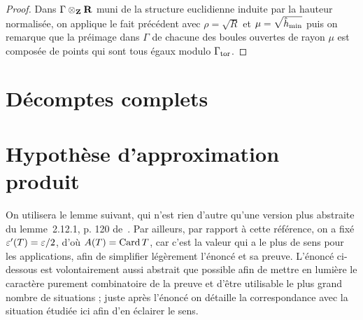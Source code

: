 \begin{proof}
  Dans \( \Gamma \otimes_{\mathbf{Z}} {\mathbf{R}} \) muni de la structure euclidienne induite par
  la hauteur normalisée, on applique le fait précédent avec \( \rho = \sqrt R
  \) et \( \mu = \sqrt{\hat h_{\mathrm{min}}} \) puis on remarque que la préimage dans \(
    \Gamma \) de chacune des boules ouvertes de rayon \( \mu \) est composée
  de points qui sont tous égaux modulo \( \Gamma_{\mathrm{tor}} \).
\end{proof}



\section{Décomptes complets}
\label{sec:all-points}



\section{Hypothèse d'approximation produit}
\label{sec:ha-prod}

On utilisera le lemme suivant, qui n'est rien d'autre qu'une version plus
abstraite du lemme~2.12.1, p. 120 de~\cite{farhith}. Par ailleurs, par rapport
à cette référence, on a fixé \( \varepsilon'(T) = \varepsilon/2 \), d'où \( A(T) = \operatorname{Card} T
\), car c'est la valeur qui a le plus de sens pour les applications, afin de
simplifier légèrement l'énoncé et sa preuve. L'énoncé ci-dessous est
volontairement aussi abstrait que possible afin de mettre en lumière le
caractère purement combinatoire de la preuve et d'être utilisable le plus
grand nombre de situations ; juste après l'énoncé on détaille la
correspondance avec la situation étudiée ici afin d'en éclairer le sens.

